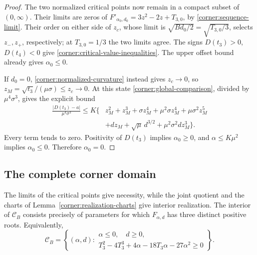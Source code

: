 \begin{proof}
The two normalized critical points now remain in a compact subset of
$(0,\infty)$.  Their limits are zeros of
$F'_{\alpha_0,d_0}=3z^2-2z+T_{3,0}$, by
\eqref{corner:sequence-limit}.  Their order on either side of $z_c$,
whose limit is $\sqrt{Bd_0/2}=\sqrt{T_{3,0}/3}$,
selects $z_-,z_+$, respectively; at $T_{3,0}=1/3$ the two
limits agree.  The signs $D(t_3)>0$, $D(t_4)<0$ give
\eqref{corner:critical-value-inequalities}.  The upper offset bound
already gives $\alpha_0\leq0$.

If $d_0=0$, \eqref{corner:normalized-curvature} instead gives
$z_c\to0$, so $z_M=\sqrt{t_3}/(\mu\sigma)\leq z_c\to0$.
At this state \eqref{corner:global-comparison}, divided by
$\mu^4\sigma^3$, gives the explicit bound
\begin{align*}
 \frac{|D(t_3)-a|}{\mu^4\sigma^3}\leq K\{&
 z_M^2+z_M^3+\sigma z_M^4+\mu^2\sigma z_M^4
       +\mu\sigma^2z_M^5\\
 &+dz_M+\sqrt\mu\,d^{3/2}
       +\mu^2\sigma^2d z_M^3\}.
\end{align*}
Every term tends to zero.  Positivity of $D(t_3)$ implies
$\alpha_0\geq0$, and $\alpha\leq K\mu^2$ implies
$\alpha_0\leq0$.  Therefore $\alpha_0=0$.
\end{proof}

\subsection{The complete corner domain}

The limits of the critical points give necessity, while the joint quotient
and the charts of Lemma~\ref{corner:realization-charts} give interior
realization.
The interior of $\mathcal C_B$ consists precisely of parameters for which
$F_{\alpha,d}$ has three distinct positive roots.  Equivalently,
\begin{equation}\label{corner:discriminant}
 \mathcal C_B=
 \left\{(\alpha,d):
 \begin{array}{l}
 \alpha\leq0,\quad d\geq0,\\
 T_3^2-4T_3^3+4\alpha-18T_3\alpha-27\alpha^2\geq0
 \end{array}\right\}.
\end{equation}

